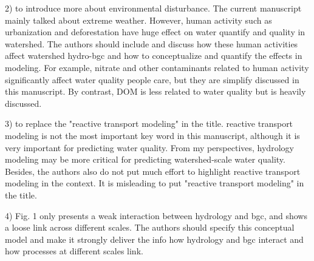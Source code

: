 2) to introduce more about environmental disturbance. The current manuscript mainly talked about extreme weather. However, human activity such as urbanization and deforestation have huge effect on water quantify and quality in watershed. The authors should include and discuss how these human activities affect watershed hydro-bgc and how to conceptualize and quantify the effects in modeling. For example, nitrate and other contaminants related to human activity significantly affect water quality people care, but they are simplify discussed in this manuscript. By contrast, DOM is less related to water quality but is heavily discussed.    

3) to replace the "reactive transport modeling" in the title. reactive transport modeling is not the most important key word in this manuscript, although it is very important for predicting water quality. From my perspectives, hydrology modeling may be more critical for predicting watershed-scale water quality. Besides, the authors also do not put much effort to highlight reactive transport modeling in the context. It is misleading to put "reactive transport modeling" in the title.

4) Fig. 1 only presents a weak interaction between hydrology and bgc, and shows a loose link across different scales. The authors should specify this conceptual model and make it strongly deliver the info how hydrology and bgc interact and how processes at different scales link.
